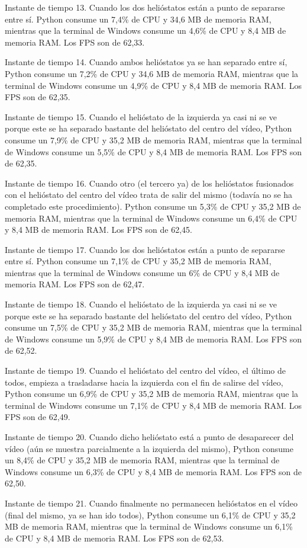 \documentclass[12pt]{article}
\begin{document}
Instante de tiempo 13. Cuando los dos helióstatos están a punto de separarse entre sí. Python consume un 7,4\% de CPU y 34,6 MB de memoria RAM, mientras que la terminal de Windows consume un 4,6\% de CPU y 8,4 MB de memoria RAM. Los FPS son de 62,33.




Instante de tiempo 14. Cuando ambos helióstatos ya se han separado entre sí, Python consume un 7,2\% de CPU y 34,6 MB de memoria RAM, mientras que la terminal de Windows consume un 4,9\% de CPU y 8,4 MB de memoria RAM. Los FPS son de 62,35.




Instante de tiempo 15. Cuando el helióstato de la izquierda ya casi ni se ve porque este se ha separado bastante del helióstato del centro del vídeo, Python consume un 7,9\% de CPU y 35,2 MB de memoria RAM, mientras que la terminal de Windows consume un 5,5\% de CPU y 8,4 MB de memoria RAM. Los FPS son de 62,35.




Instante de tiempo 16. Cuando otro (el tercero ya) de los helióstatos fusionados con el helióstato del centro del vídeo trata de salir del mismo (todavía no se ha completado este procedimiento). Python consume un 5,3\% de CPU y 35,2 MB de memoria RAM, mientras que la terminal de Windows consume un 6,4\% de CPU y 8,4 MB de memoria RAM. Los FPS son de 62,45.




Instante de tiempo 17. Cuando los dos helióstatos están a punto de separarse entre sí. Python consume un 7,1\% de CPU y 35,2 MB de memoria RAM, mientras que la terminal de Windows consume un 6\% de CPU y 8,4 MB de memoria RAM. Los FPS son de 62,47.




Instante de tiempo 18. Cuando el helióstato de la izquierda ya casi ni se ve porque este se ha separado bastante del helióstato del centro del vídeo, Python consume un 7,5\% de CPU y 35,2 MB de memoria RAM, mientras que la terminal de Windows consume un 5,9\% de CPU y 8,4 MB de memoria RAM. Los FPS son de 62,52.




Instante de tiempo 19. Cuando el helióstato del centro del vídeo, el último de todos, empieza a trasladarse hacia la izquierda con el fin de salirse del vídeo, Python consume un 6,9\% de CPU y 35,2 MB de memoria RAM, mientras que la terminal de Windows consume un 7,1\% de CPU y 8,4 MB de memoria RAM. Los FPS son de 62,49.




Instante de tiempo 20. Cuando dicho helióstato está a punto de desaparecer del vídeo (aún se muestra parcialmente a la izquierda del mismo), Python consume un 8,4\% de CPU y 35,2 MB de memoria RAM, mientras que la terminal de Windows consume un 6,3\% de CPU y 8,4 MB de memoria RAM. Los FPS son de 62,50.




Instante de tiempo 21. Cuando finalmente no permanecen helióstatos en el vídeo (final del mismo, ya se han ido todos), Python consume un 6,1\% de CPU y 35,2 MB de memoria RAM, mientras que la terminal de Windows consume un 6,1\% de CPU y 8,4 MB de memoria RAM. Los FPS son de 62,53.
\end{document}
